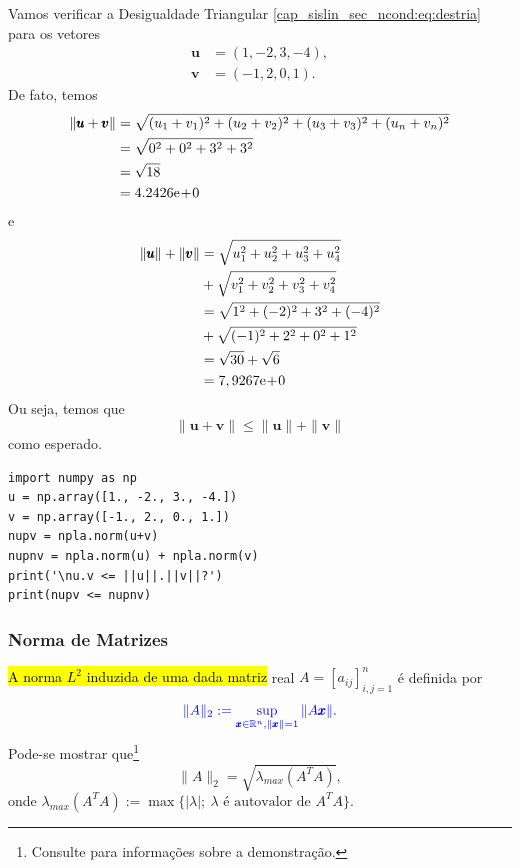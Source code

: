 \begin{ex}
  Vamos verificar a Desigualdade Triangular \eqref{cap_sislin_sec_ncond:eq:destria} para os vetores
  \begin{align}
    \pmb{u} &= (1, -2, 3, -4),\\
    \pmb{v} &= (-1, 2, 0, 1).    
  \end{align}
  De fato, temos
  \begin{align}
    \|\pmb{u}+\pmb{v}\| &= \sqrt{(u_1+v_1)^2 + (u_2+v_2)^2 + (u_3+v_3)^2 + (u_n+v_n)^2}\\
                        &= \sqrt{0^2 + 0^2 + 3^2 + 3^2}\\
                        &= \sqrt{18}\\
                        &= 4.2426\mathrm{e}\!+\!0
  \end{align}
  e
  \begin{align}
    \|\pmb{u}\|+\|\pmb{v}\| &= \sqrt{u_1^2 + u_2^2 + u_3^2 + u_4^2} \nonumber\\
                            &+ \sqrt{v_1^2 + v_2^2 + v_3^2 + v_4^2}\\
                            &= \sqrt{1^2 + (-2)^2 + 3^2 + (-4)^2} \nonumber\\
                            &+ \sqrt{(-1)^2 + 2^2 + 0^2 + 1^2}\\
                            &= \sqrt{30} + \sqrt{6}\\
                            &= 7,9267\mathrm{e}\!+\!0
  \end{align}
  Ou seja, temos que
  \begin{equation}
    \|\pmb{u}+\pmb{v}\| \leq \|\pmb{u}\|+\|\pmb{v}\| 
  \end{equation}
  como esperado.

\begin{lstlisting}
import numpy as np
u = np.array([1., -2., 3., -4.])
v = np.array([-1., 2., 0., 1.])
nupv = npla.norm(u+v)
nupnv = npla.norm(u) + npla.norm(v)
print('\nu.v <= ||u||.||v||?')
print(nupv <= nupnv)
\end{lstlisting}
\end{ex}

\subsubsection{Norma de Matrizes}

\hl{A norma $L^2$ induzida de uma dada matriz} real $A = [a_{ij}]_{i,j=1}^n$ é definida por
\begin{equation}\color{blue}\|A\|_2 := \sup_{\pmb{x}\in\mathbb{R}^n, \|\pmb{x}\|=1} \|A\pmb{x}\|.
\end{equation}
Pode-se mostrar que\footnote{Consulte \cite[Section 1.3-3]{Ralston2001a} para informações sobre a demonstração.}
\begin{equation}
  \|A\|_2 = \sqrt{\lambda_{max}(A^TA)},
\end{equation}
onde $\lambda_{max}(A^TA) := \max\{|\lambda|;~\lambda\text{ é autovalor de }A^TA\}$.

